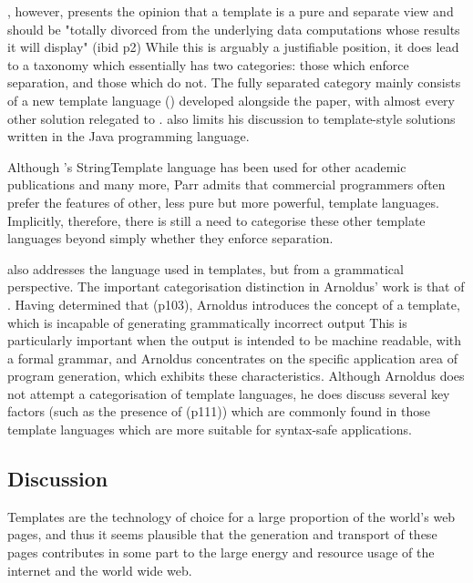 \citeauthor{Parr2004}, however, presents the opinion that a template is a pure and separate view and should be "totally divorced from the underlying data computations whose results it will display" (ibid p2) While this is arguably a justifiable position, it does lead to a taxonomy which essentially has two categories: those which enforce separation, and those which do not. The fully separated category mainly consists of a new template language () developed alongside the paper, with almost every other solution relegated to . \citeauthor{Parr2004} also limits his discussion to template-style solutions written in the Java programming language.

Although \citeauthor{Parr2004}'s StringTemplate language has been used for other academic publications \citep{Fritzson2009} \citep{Arnoldus2010} \citep{Hartmann2011} \citep{Arnoldus2012} \citep{Vollebregt} and many more, Parr admits that commercial programmers often prefer the features of other, less pure but more powerful, template languages. Implicitly, therefore, there is still a need to categorise these other template languages beyond simply whether they enforce separation.

\cite{Arnoldus2010} also addresses the language used in templates, but from a grammatical perspective. The important categorisation distinction in Arnoldus’ work is that of . Having determined that  (p103), Arnoldus introduces the concept of a  template, which is incapable of generating grammatically incorrect output This is particularly important when the output is intended to be machine readable, with a formal grammar, and Arnoldus concentrates on the specific application area of program generation, which exhibits these characteristics. Although Arnoldus does not attempt a categorisation of template languages, he does discuss several key factors (such as the presence of  (p111)) which are commonly found in those template languages which are more suitable for syntax-safe applications.

\subsection{Discussion}

Templates are the technology of choice for a large proportion of the world's web pages, and thus it seems plausible that the generation and transport of these pages contributes in some part to the large energy and resource usage of the internet and the world wide web.

